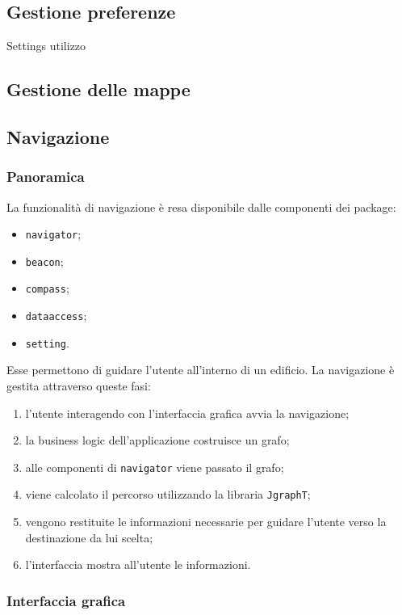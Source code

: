 \documentclass[../ManualeSviluppatore.tex]{subfiles}
\begin{document}
	\subsection{Gestione preferenze}

				
		Settings
		utilizzo
		
	
	\subsection{Gestione delle mappe}
			
		
	
	\subsection{Navigazione}

		\subsubsection{Panoramica}
			La funzionalità di navigazione è resa disponibile dalle componenti dei package:
			\begin{itemize}
				\item \verb|navigator|;
				\item \verb|beacon|;
				\item \verb|compass|;
				\item \verb|dataaccess|;
				\item \verb|setting|.
			\end{itemize}
			Esse permettono di guidare l'utente all'interno di un edificio.
			La navigazione è gestita attraverso queste fasi:
			\begin{enumerate}
				\item l'utente interagendo con l'interfaccia grafica avvia la navigazione;
				\item la business logic dell'applicazione costruisce un grafo;
				\item alle componenti di \verb|navigator| viene passato il grafo;
				\item viene calcolato il percorso utilizzando la libraria \verb|JgraphT|;
				\item vengono restituite le informazioni necessarie per guidare l'utente verso la destinazione da lui scelta;
				\item l'interfaccia mostra all'utente le informazioni.
			\end{enumerate}
			
		\subsubsection{Interfaccia grafica}
		
\end{document}
